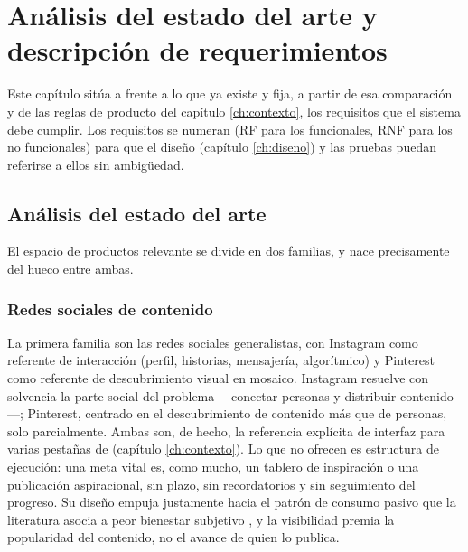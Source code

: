 
\chapter{Análisis del estado del arte y descripción de requerimientos}
\label{ch:estado-del-arte}

Este capítulo sitúa a \bukit frente a lo que ya existe y fija, a partir de esa comparación y de las reglas de producto del capítulo \ref{ch:contexto}, los requisitos que el sistema debe cumplir.
Los requisitos se numeran (RF para los funcionales, RNF para los no funcionales) para que el diseño (capítulo \ref{ch:diseno}) y las pruebas puedan referirse a ellos sin ambigüedad.

\section{Análisis del estado del arte}
\label{sec:estado-arte}

El espacio de productos relevante se divide en dos familias, y \bukit nace precisamente del hueco entre ambas.

\subsection{Redes sociales de contenido}
\label{sec:estado-arte-redes}

La primera familia son las redes sociales generalistas, con Instagram \parencite{instagram-app} como referente de interacción (perfil, historias, mensajería,  algorítmico) y Pinterest \parencite{pinterest-app} como referente de descubrimiento visual en mosaico.
Instagram resuelve con solvencia la parte social del problema —conectar personas y distribuir contenido—; Pinterest, centrado en el descubrimiento de contenido más que de personas, solo parcialmente.
Ambas son, de hecho, la referencia explícita de interfaz para varias pestañas de \bukit (capítulo \ref{ch:contexto}).
Lo que no ofrecen es estructura de ejecución: una meta vital es, como mucho, un tablero de inspiración o una publicación aspiracional, sin plazo, sin recordatorios y sin seguimiento del progreso.
Su diseño empuja justamente hacia el patrón de consumo pasivo que la literatura asocia a peor bienestar subjetivo \parencite{verduyn-sns}, y la visibilidad premia la popularidad del contenido, no el avance de quien lo publica.


